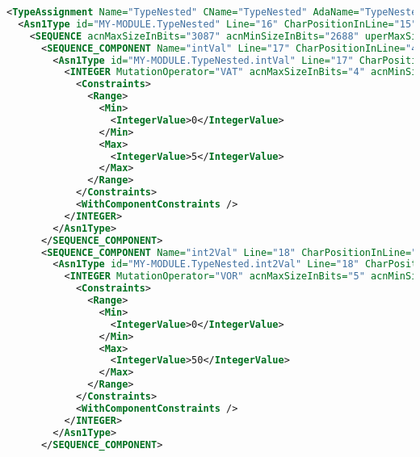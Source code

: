 
\begin{minipage}{15cm}
\begin{lstlisting}[language=XML, caption=ASN1 grammar updated to reflect a fault model., label=asnXMLUpdated, mathescape=true]
<TypeAssignment Name="TypeNested" CName="TypeNested" AdaName="TypeNested" Line="16" CharPositionInLine="0">
  <Asn1Type id="MY-MODULE.TypeNested" Line="16" CharPositionInLine="15" ParameterizedTypeInstance="false">
    <SEQUENCE acnMaxSizeInBits="3087" acnMinSizeInBits="2688" uperMaxSizeInBits="3087" uperMinSizeInBits="528">
      <SEQUENCE_COMPONENT Name="intVal" Line="17" CharPositionInLine="4" AdaName="intVal" CName="intVal">
        <Asn1Type id="MY-MODULE.TypeNested.intVal" Line="17" CharPositionInLine="11" ParameterizedTypeInstance="false">
          <INTEGER MutationOperator="VAT" acnMaxSizeInBits="4" acnMinSizeInBits="4" uperMaxSizeInBits="4" uperMinSizeInBits="4">
            <Constraints>
              <Range>
                <Min>
                  <IntegerValue>0</IntegerValue>
                </Min>
                <Max>
                  <IntegerValue>5</IntegerValue>
                </Max>
              </Range>
            </Constraints>
            <WithComponentConstraints />
          </INTEGER>
        </Asn1Type>
      </SEQUENCE_COMPONENT>
      <SEQUENCE_COMPONENT Name="int2Val" Line="18" CharPositionInLine="4" AdaName="int2Val" CName="int2Val">
        <Asn1Type id="MY-MODULE.TypeNested.int2Val" Line="18" CharPositionInLine="12" ParameterizedTypeInstance="false">
          <INTEGER MutationOperator="VOR" acnMaxSizeInBits="5" acnMinSizeInBits="5" uperMaxSizeInBits="5" uperMinSizeInBits="5">
            <Constraints>
              <Range>
                <Min>
                  <IntegerValue>0</IntegerValue>
                </Min>
                <Max>
                  <IntegerValue>50</IntegerValue>
                </Max>
              </Range>
            </Constraints>
            <WithComponentConstraints />
          </INTEGER>
        </Asn1Type>
      </SEQUENCE_COMPONENT>
\end{lstlisting}
\end{minipage}


